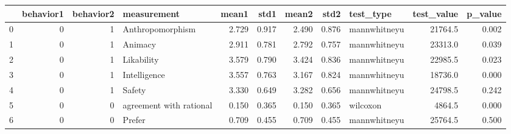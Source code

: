 \begin{tabular}{lrrlrrrrlrr}
\toprule
{} &  behavior1 &  behavior2 &              measurement &  mean1 &   std1 &  mean2 &   std2 &     test\_type &  test\_value &  p\_value \\
\midrule
0 &          0 &          1 &         Anthropomorphism &  2.729 &  0.917 &  2.490 &  0.876 &  mannwhitneyu &     21764.5 &    0.002 \\
1 &          0 &          1 &                  Animacy &  2.911 &  0.781 &  2.792 &  0.757 &  mannwhitneyu &     23313.0 &    0.039 \\
2 &          0 &          1 &               Likability &  3.579 &  0.790 &  3.424 &  0.836 &  mannwhitneyu &     22985.5 &    0.023 \\
3 &          0 &          1 &             Intelligence &  3.557 &  0.763 &  3.167 &  0.824 &  mannwhitneyu &     18736.0 &    0.000 \\
4 &          0 &          1 &                   Safety &  3.330 &  0.649 &  3.282 &  0.656 &  mannwhitneyu &     24798.5 &    0.242 \\
5 &          0 &          0 &  agreement with rational &  0.150 &  0.365 &  0.150 &  0.365 &      wilcoxon &      4864.5 &    0.000 \\
6 &          0 &          0 &                   Prefer &  0.709 &  0.455 &  0.709 &  0.455 &  mannwhitneyu &     25764.5 &    0.500 \\
\bottomrule
\end{tabular}
